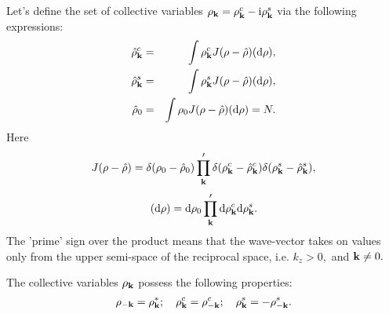 Let's define the set of collective variables $\rho_{\vb k} = \rho_{\vb k}^c - {\rm i} \rho_{\vb k}^s$ via the following expressions:
\begin{eqnarray}
	\label{def:col_var}
	\hat{\rho}_{\vb k}^c &=& \int\rho_{\vb k}^c J(\rho - \hat{\rho}) ({\rm d}\rho),
	\nonumber\\
	\hat{\rho}_{\vb k}^s &=& \int\rho_{\vb k}^s J(\rho - \hat{\rho}) ({\rm d}\rho),
	\nonumber\\
	\hat{\rho}_0 &=&  \int\rho_0 J(\rho - \hat{\rho}) ({\rm d}\rho) = N.
\end{eqnarray}
Here
\begin{equation}
	J(\rho - \hat{\rho}) = \delta(\rho_0 - \hat{\rho}_0) \prod_{\vb k}' \delta(\rho_{\vb k}^c - \hat{\rho}_{\vb k}^c) \delta(\rho_{\vb k}^s - \hat{\rho}_{\vb k}^s),
\end{equation}
\begin{equation}
	({\rm d} \rho) = {\rm d}\rho_0 \prod_{\vb k}' {\rm d}\rho_{\vb k}^c {\rm d}\rho_{\vb k}^s.
\end{equation}
The 'prime' sign over the product means that the wave-vector takes on values only from the upper semi-space of the reciprocal space, i.e. $k_z>0,$ and $\vb k \neq 0.$

The collective variables $\rho_{\vb k}$ possess the following properties:
\begin{equation}
	\rho_{-\vb k} = \rho_{\vb k}^*; \quad \rho_{\vb k}^c = \rho_{-\vb k}^c; \quad \rho_{\vb k}^s = -\rho_{-\vb k}^s.
\end{equation}

